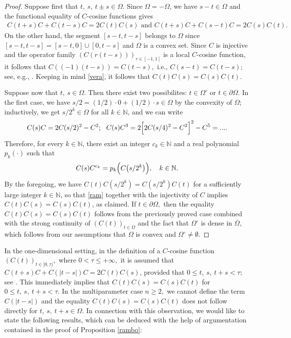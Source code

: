 \documentclass{amsart}
\theoremstyle{definition}
\theoremstyle{remark}
\numberwithin{equation}{section}
\begin{document}
\begin{proof}
Suppose first that $t,\ s,\ t\pm s\in \Omega.$ Since $\Omega=-\Omega$, we have $s-t\in \Omega$ and the functional equality of $C$-cosine functions
gives 
\begin{align}\label{vera}
C(t+s)C+C(t-s)C=2C(t)C(s)\mbox{ and }C(t+s)C+C(s-t)C=2C(s)C(t).
\end{align}
On the other hand, the segment $[s-t,t-s]$ belongs to $\Omega$ since $[s-t,t-s]=[s-t,0] \cup [0,t-s]$ and $\Omega$ is a convex set. Since $C$ is injective and the operator family $(C(r(t-s)))_{r\in [-1,1]}$ is a local $C$-cosine function, it follows that $C((-1)(t-s))=C(t-s),$ i.e., $C(s-t)=C(t-s);$ see, e.g., \cite{tajw}. Keeping in mind \eqref{vera}, it follows that $C(t)C(s)=C(s)C(t)$.

Suppose now that $t,\ s\in \Omega.$ Then there exist two possibilites: $t\in \Omega^{\circ}$ or $t\in \partial \Omega.$ In the first case, we have $s/2=(1/2) \cdot 0+(1/2) \cdot s \in \Omega$ by the convexity of $\Omega$; inductively, we get $s/2^{k}\in  \Omega$ for all $k\in {\mathbb N}$, and we can write
\begin{align*}
C(s)C=2C(s/2)^{2}-C^{2}; \ \ C(s)C^{3}=2\Bigl[ 2C(s/4)^{2}-C^{2}\Bigr]^{2}-C^{5}=....
\end{align*}
Therefore, for every $k\in {\mathbb N}$, there exist an integer $c_{k}\in {\mathbb N}$ and a real polynomial $p_{k}(\cdot)$ such that
\begin{align}\label{ram}
C(s)C^{c_{k}}=p_{k}\Bigl(C\bigl(s/2^{k}\bigr)\Bigr),\quad k\in {\mathbb N}.
\end{align}
By the foregoing, we have $C(t)C(s/2^{k})=C(s/2^{k})C(t)$ for a sufficiently large integer $k\in {\mathbb N}$, so that \eqref{ram} together with the injectivity of $C$ implies $C(t)C(s)=C(s)C(t)$,
as claimed.
If $t\in \partial \Omega,$ then the equality $C(t)C(s)=C(s)C(t)$ follows from the previously proved case combined with the strong continuity of $(C(t))_{t\in \Omega} $ and the fact that $\Omega^{\circ}$ is dense in $\overline{\Omega},$ which follows from our assumptions that $\Omega  $ is convex and $\Omega^{\circ} \neq \emptyset$.  
\end{proof}

In the one-dimensional setting, in the definition of a $C$-cosine function $(C(t))_{t\in [0,\tau)},$ where $0<\tau \leq +\infty,$ it is assumed that $C(t+s)C+C(|t-s|)C=2C(t)C(s)$, provided that $0\leq t,\ s,\ t+s<\tau;$ see \cite[p. 5]{tajw}. This immediately implies that  $C(t)C(s)=C(s)C(t)$ for $0\leq t,\ s,\ t+s<\tau .$ In the multiparameter case $n\geq 2,$ we cannot define the term $C(|t-s|)$ and the equality $C(t)C(s)=C(s)C(t)$ does not follow directly for $t,\ s,\ t+s\in \Omega $. In connection with this observation, we would like to state  the following results, which can be deduced with the help of argumentation contained in the proof of Proposition \ref{rambo}:
\end{document}
